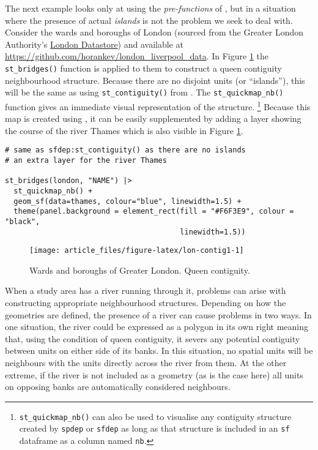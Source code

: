 The next example looks only at using the \emph{pre-functions} of , but in a situation where the presence of actual \emph{islands} is not the problem we seek to deal with. Consider the wards and boroughs of London (sourced from the Greater London Authority's \href{https://data.london.gov.uk/}{London Datastore}) and available at
\url{https://github.com/horankev/london_liverpool_data}. In Figure \ref{fig:lon-contig1} the \texttt{st\_bridges()}
function is applied to them to construct a queen contiguity
neighbourhood structure. Because there are no disjoint units (or
``islands''), this will be the same as using \texttt{st\_contiguity()} from
. The \texttt{st\_quickmap\_nb()} function gives an immediate
visual representation of the structure. \footnote{\texttt{st\_quickmap\_nb()} can also be used to visualise any contiguity structure created by \texttt{spdep} or \texttt{sfdep} as long as that structure is included in an \texttt{sf} dataframe as a column named \texttt{nb}.} Because this map is created using , it can be easily supplemented by adding a layer showing the course of the river Thames which is also visible in Figure \ref{fig:lon-contig1}.

\begin{verbatim}
# same as sfdep:st_contiguity() as there are no islands
# an extra layer for the river Thames

st_bridges(london, "NAME") |> 
  st_quickmap_nb() + 
  geom_sf(data=thames, colour="blue", linewidth=1.5) + 
  theme(panel.background = element_rect(fill = "#F6F3E9", colour = "black", 
                                        linewidth=1.5))
\end{verbatim}

\begin{figure}

{\centering \texttt{[image: article\_files/figure-latex/lon-contig1-1]} 

}

\caption{Wards and boroughs of Greater London. Queen contiguity. }\label{fig:lon-contig1}
\end{figure}

When a study area has a river running through it, problems can arise with constructing appropriate neighbourhood structures. Depending on how the
geometries are defined, the presence of a river can cause problems in two ways. In one situation, the river could be expressed as a polygon in its own right meaning that, using the condition of queen contiguity, it severs any potential contiguity between units on either side of its banks. In this situation, no spatial units will be neighbours with the units directly across the river from them. At the other extreme, if the river is not included as a geometry (as is the case here) all units on opposing banks are automatically considered neighbours.


